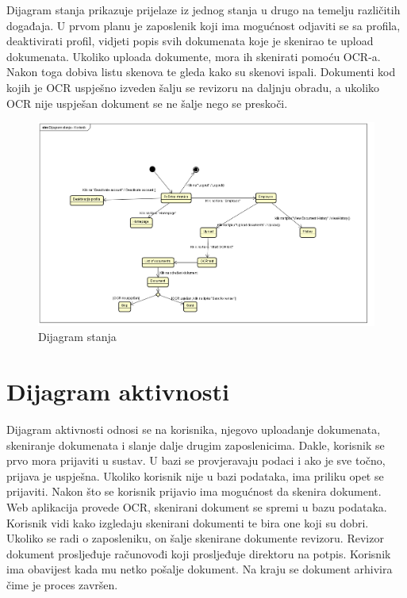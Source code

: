 			Dijagram stanja prikazuje prijelaze iz jednog stanja u drugo na temelju različitih događaja. U prvom planu je zaposlenik koji ima mogućnost odjaviti se sa profila, deaktivirati profil, vidjeti popis svih dokumenata koje je skenirao te upload dokumenata. Ukoliko uploada dokumente, mora ih skenirati pomoću OCR-a. Nakon toga dobiva listu skenova te gleda kako su skenovi ispali. Dokumenti kod kojih je OCR uspješno izveden šalju se revizoru na daljnju obradu, a ukoliko OCR nije uspješan dokument se ne šalje nego se preskoči.
			
			\begin{figure}[H]
				\includegraphics[scale=0.5]{slike/Dijagram stanja.png} %
				\centering
				\caption{Dijagram stanja}
				\label{DS}
			\end{figure}
			
			\eject 
		
		\section{Dijagram aktivnosti}
			
			 Dijagram aktivnosti odnosi se na korisnika, njegovo uploadanje dokumenata, skeniranje dokumenata i slanje dalje drugim zaposlenicima. Dakle, korisnik se prvo mora prijaviti u sustav. U bazi se provjeravaju podaci i ako je sve točno, prijava je uspješna. Ukoliko korisnik nije u bazi podataka, ima priliku opet se prijaviti. Nakon što se korisnik prijavio ima mogućnost da skenira dokument. Web aplikacija provede OCR, skenirani dokument se spremi u bazu podataka. Korisnik vidi kako izgledaju skenirani dokumenti te bira one koji su dobri. Ukoliko se radi o zaposleniku, on šalje skenirane dokumente revizoru. Revizor dokument prosljeđuje računovođi koji prosljeđuje direktoru na potpis. Korisnik ima obavijest kada mu netko pošalje dokument. Na kraju se dokument arhivira čime je proces završen.
			 
